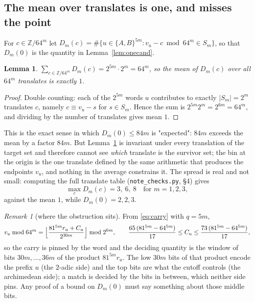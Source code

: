 \documentclass[11pt,a4paper]{article}
\theoremstyle{plain}
\newtheorem{lemma}[theorem]{Lemma}
\theoremstyle{definition}
\theoremstyle{remark}
\newtheorem{remark}[theorem]{Remark}
\begin{document}
\subsection{The mean over translates is one, and misses the point}

For $c\in\mathbb{Z}/64^m$ let
$D_m(c)=\#\{u\in\{A,B\}^{5m}: v_u-c \bmod 64^m\in S_m\}$, so that $D_m(0)$ is
the quantity in Lemma~\ref{lem:onecand}.

\begin{lemma}\label{lem:mean}
$\displaystyle\sum_{c\in\mathbb{Z}/64^m}D_m(c)=2^{5m}\cdot 2^{m}=64^{m}$, so
the mean of $D_m(c)$ over all $64^m$ translates is exactly $1$.
\end{lemma}

\begin{proof}
Double counting: each of the $2^{5m}$ words $u$ contributes to exactly
$|S_m|=2^m$ translates $c$, namely $c\equiv v_u-s$ for $s\in S_m$. Hence the
sum is $2^{5m}2^m=2^{6m}=64^m$, and dividing by the number of translates gives
mean $1$.
\end{proof}

This is the exact sense in which $D_m(0)\le 84m$ is "expected": $84m$ exceeds
the mean by a factor $84m$. But Lemma~\ref{lem:mean} is invariant under every
translation of the target set and therefore cannot see \emph{which} translate
is the survivor set; the bin at the origin is the one translate defined by the
same arithmetic that produces the endpoints $v_u$, and nothing in the average
constrains it. The spread is real and not small: computing the full translate
table (\texttt{note\_checks.py}, \S4) gives
\[
\max_c D_m(c)=3,\ 6,\ 8 \quad\text{for } m=1,2,3,
\]
against the mean $1$, while $D_m(0)=2,2,3$.

\begin{remark}[where the obstruction sits]
From \eqref{eq:carry} with $q=5m$,
\[
v_u \bmod 64^m=\Bigl\lfloor\frac{81^{5m}r_u+C_u}{2^{30m}}\Bigr\rfloor \bmod 2^{6m},
\qquad
\frac{65\,(81^{5m}-64^{5m})}{17}\le C_u\le\frac{73\,(81^{5m}-64^{5m})}{17},
\]
so the carry is pinned by the word and the deciding quantity is the window of
bits $30m,\dots,36m$ of the product $81^{5m}r_u$. The low $30m$ bits of that
product encode the prefix $u$ (the $2$-adic side) and the top bits are what the
cutoff controls (the archimedean side); a match is decided by the bits in
between, which neither side pins. Any proof of a bound on $D_m(0)$ must say
something about those middle bits.
\end{remark}
\end{document}
